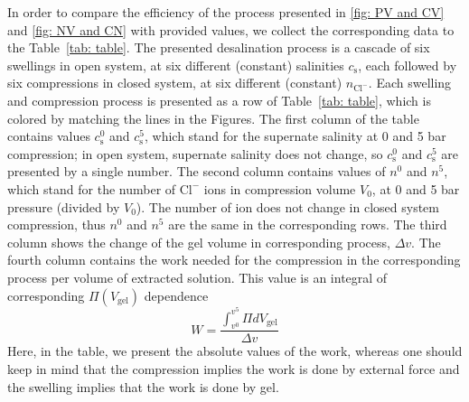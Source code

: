 \documentclass[journal,article,submit,pdftex,moreauthors]{Definitions/mdpi}
\newcommand{\ncl}{n_\mathrm{Cl^-}}
\newcommand{\cl}{\mathrm{Cl^-}}
\newcommand{\cs}{c_{\mathrm{s}}}
\newcommand{\Vgel}{V_\mathrm{gel}}
\newcommand{\Pgel}{\Pi}
\newcommand{\Vbox}{V_0}
\begin{document}
In order to compare the efficiency of the process presented in \ref{fig: PV and CV} and \ref{fig: NV and CN} with provided values, we collect the corresponding data to the Table~\ref{tab: table}.
The presented desalination process is a cascade of six swellings in open system, at six different (constant) salinities $\cs$, each followed by six compressions in closed system, at six different (constant) $\ncl$.
Each swelling and compression process is presented as a row of Table~\ref{tab: table}, which is colored by matching the lines in the Figures.
The first column of the table contains values $\cs^0$ and $\cs^5$, which stand for the supernate salinity at 0 and 5 bar compression; in open system, supernate salinity does not change, so $\cs^0$ and $\cs^5$ are presented by a single number. 
The second column contains values of $n^0$ and $n^5$, which stand for the number of $\cl$ ions in compression volume $\Vbox$, at 0 and 5 bar pressure (divided by $\Vbox$). 
The number of ion does not change in closed system compression, thus $n^0$ and $n^5$ are the same in the corresponding rows.
The third column shows the change of the gel volume in corresponding process, $\Delta v$. 
The fourth column contains the work needed for the compression in the corresponding process 
per volume of extracted solution. 
This value is an integral of corresponding $\Pgel(\Vgel)$ dependence \citep{Atkins} 
\begin{equation}
    W = \frac{\int_{v^0}^{v^5} \Pgel d\Vgel}{\Delta v}
\end{equation}
Here, in the table, we present the absolute values of the work, 
whereas one should keep in mind that the compression implies the work 
is done by external force and the swelling implies that the work is done by gel.
\end{document}
